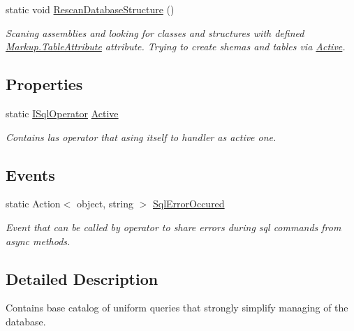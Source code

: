 \begin{DoxyCompactItemize}
static void \mbox{\hyperlink{class_uniform_data_operator_1_1_sql_1_1_sql_operator_handler_a98735f024767c0551a0a8fccf0957fea}{Rescan\+Database\+Structure}} ()
\begin{DoxyCompactList}\small\item\em Scaning assemblies and looking for classes and structures with defined \mbox{\hyperlink{class_uniform_data_operator_1_1_sql_1_1_markup_1_1_table_attribute}{Markup.\+Table\+Attribute}} attribute. Trying to create shemas and tables via \mbox{\hyperlink{class_uniform_data_operator_1_1_sql_1_1_sql_operator_handler_aa96eb9fd201700acbf53954599fec534}{Active}}. \end{DoxyCompactList}\end{DoxyCompactItemize}
\subsection*{Properties}
\begin{DoxyCompactItemize}
\item 
static \mbox{\hyperlink{interface_uniform_data_operator_1_1_sql_1_1_i_sql_operator}{I\+Sql\+Operator}} \mbox{\hyperlink{class_uniform_data_operator_1_1_sql_1_1_sql_operator_handler_aa96eb9fd201700acbf53954599fec534}{Active}}
\begin{DoxyCompactList}\small\item\em Contains las operator that asing itself to handler as active one. \end{DoxyCompactList}\end{DoxyCompactItemize}
\subsection*{Events}
\begin{DoxyCompactItemize}
\item 
static Action$<$ object, string $>$ \mbox{\hyperlink{class_uniform_data_operator_1_1_sql_1_1_sql_operator_handler_a8373486df36ace17ffba1e14bf6a951a}{Sql\+Error\+Occured}}
\begin{DoxyCompactList}\small\item\em Event that can be called by operator to share errors during sql commands from async methods. \end{DoxyCompactList}\end{DoxyCompactItemize}


\subsection{Detailed Description}
Contains base catalog of uniform queries that strongly simplify managing of the database. 



